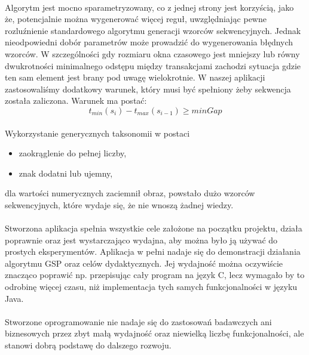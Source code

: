 \documentclass[11pt,a4paper]{article}
\begin{document}
\paragraph{}Algorytm jest mocno sparametryzowany, co z jednej strony jest korzyścią, jako że, potencjalnie można wygenerować więcej reguł, uwzględniając pewne rozluźnienie standardowego algorytmu generacji wzorców sekwencyjnych. Jednak nieodpowiedni dobór parametrów może prowadzić do wygenerowania błędnych wzorców. W szczególności gdy rozmiaru okna czasowego jest mniejszy lub równy dwukrotności minimalnego odstępu między transakcjami zachodzi sytuacja gdzie ten sam element jest brany pod uwagę wielokrotnie. W naszej aplikacji zastosowaliśmy dodatkowy warunek, który musi być spełniony żeby sekwencja została zaliczona. Warunek ma postać:
\begin{equation}
t_{min}(s_i) - t_{max}(s_{i-1}) \geq minGap
\end{equation}
\paragraph{}Wykorzystanie generycznych taksonomii w postaci
\begin{itemize}
\item zaokrąglenie do pełnej liczby,
\item znak dodatni lub ujemny,
\end{itemize}
dla wartości numerycznych zaciemnił obraz, powstało dużo wzorców sekwencyjnych, które wydaje się, że nie wnoszą żadnej wiedzy.
\paragraph{}Stworzona aplikacja spełnia wszystkie cele założone na początku projektu, działa poprawnie oraz jest wystarczająco wydajna, aby można było ją używać do prostych eksperymentów. Aplikacja w pełni nadaje się do demonstracji działania algorytmu GSP oraz celów dydaktycznych. Jej wydajność można oczywiście znacząco poprawić np. przepisując cały program na język C, lecz wymagało by to odrobinę więcej czasu, niż implementacja tych samych funkcjonalności w języku Java.
\paragraph{}Stworzone oprogramowanie nie nadaje się do zastosowań badawczych ani biznesowych przez zbyt małą wydajność oraz niewielką liczbę funkcjonalności, ale stanowi dobrą podstawę do dalszego rozwoju.



\nocite{*}


\end{document}
